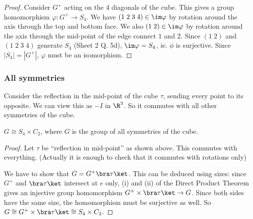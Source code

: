 \documentclass[a4paper]{article}
\begin{document}
\begin{proof}
  Consider $G^+$ acting on the 4 diagonals of the cube. This gives a group homomorphism $\varphi: G^+ \to S_4$. We have $(1\; 2\; 3\; 4)\in\im \varphi$ by rotation around the axis through the top and bottom face. We also $(1\; 2)\in \im \varphi$ by rotation around the axis through the mid-point of the edge connect $1$ and $2$. Since $(1\; 2)$ and $(1\; 2\; 3\; 4)$ generate $S_4$ (Sheet 2 Q. 5d), $\im\varphi = S_4$, ie. $\phi$ is surjective. Since $|S_4| = |G^+|$, $\varphi$ must be an isomorphism.
\end{proof}

\subsubsection*{All symmetries}
Consider the reflection in the mid-point of the cube $\tau$, sending every point to its opposite. We can view this as $-I$ in $\R^3$. So it commutes with all other symmetries of the cube.
\begin{prop}
  $G \cong S_4\times C_2$, where $G$ is the group of all symmetries of the cube.
\end{prop}

\begin{proof}
  Let $\tau$ be ``reflection in mid-point'' as shown above. This commutes with everything. (Actually it is enough to check that it commutes with rotations only)

  We have to show that $G = G^+\bra \tau\ket$. This can be deduced using sizes: since $G^+$ and $\bra\tau\ket$ intersect at $e$ only, (i) and (ii) of the Direct Product Theorem gives an injective group homomorphism $G^+\times \bra\tau\ket \to G$. Since both sides have the same size, the homomorphism must be surjective as well. So $G\cong G^+\times \bra \tau\ket \cong S_4\times C_2$.
\end{proof}
\end{document}
